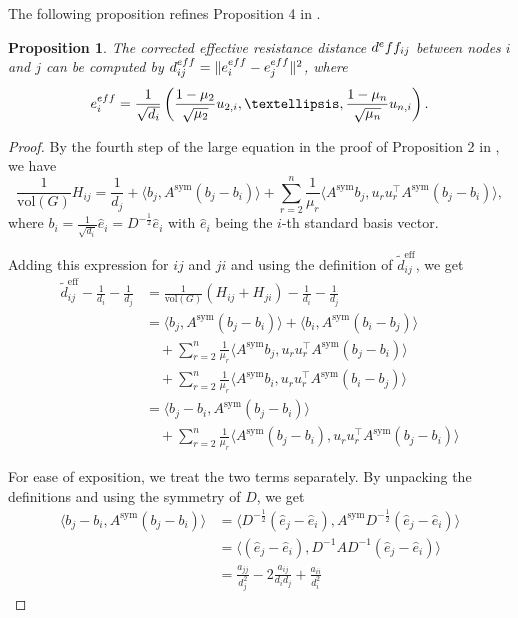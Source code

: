 \documentclass{article}
\newcommand{\asym}{A^{\text{sym}}}
\theoremstyle{plain}
\newtheorem{proposition}[theorem]{Proposition}
\theoremstyle{definition}
\theoremstyle{remark}
\begin{document}
The following proposition refines Proposition 4 in \cite{luxburg2010getting}.
\begin{proposition}\label{prop:corr_eff_res}
The corrected effective resistance distance $d^\textnormal{eff}_{ij}$ between nodes $i$ and $j$ can be computed by \mbox{$d^{\textnormal{eff}}_{ij} = \| e^{\textnormal{eff}}_i -e^{\textnormal{eff}}_j\|^2$,} where 
$$e^{\textnormal{eff}}_i = \frac{1}{\sqrt{d_i}} \left(\frac{1-\mu_2}{\sqrt{\mu_2} }u_{2,i},\dots, \frac{1-\mu_n}{\sqrt{\mu_n} }u_{n,i}\right).$$
\end{proposition}
\begin{proof}
    By the fourth step of the large equation in the proof of Proposition 2 in \cite{von2010hitting}, we have
    \begin{equation}
        \frac{1}{\text{vol}(G) }H_{ij} = \frac{1}{d_j}+ \langle b_j, \asym (b_j-b_i)\rangle + \sum_{r=2}^n \frac{1}{\mu_r} \langle \asym b_j, u_r u_r^\top \asym (b_j -b_i)\rangle,
    \end{equation}
    where $b_i = \frac{1}{\sqrt{d_i}}\hat{e}_i = D^{-\frac{1}{2}}\hat{e}_i$ with $\hat{e}_i$ being the $i$-th standard basis vector.
    
    Adding this expression for $ij$ and $ji$ and using the definition of $\tilde{d}^\text{eff}_{ij}$, we get 
    \begin{align}
        \tilde{d}^\text{eff}_{ij} - \frac{1}{d_i} - \frac{1}{d_j}
        &= \frac{1}{\text{vol}(G)} (H_{ij} + H_{ji})- \frac{1}{d_i} - \frac{1}{d_j} \\
        &= \langle b_j, \asym (b_j -b_i)\rangle +  \langle b_i, \asym (b_i -b_j)\rangle \\
        & \quad +         \sum_{r=2}^n \frac{1}{\mu_r} \langle \asym b_j, u_ru_r^\top \asym (b_j -b_i)\rangle\\
        & \quad+ \sum_{r=2}^n \frac{1}{\mu_r} \langle \asym b_i, u_r u_r^\top \asym (b_i -b_j)\rangle \\
        &= \langle b_j-b_i, \asym (b_j -b_i)\rangle \\
        &\quad + \sum_{r=2}^n \frac{1}{\mu_r} \langle \asym (b_j - b_i), u_r u_r^\top \asym (b_j -b_i)\rangle
    \end{align}
    
    For ease of exposition, we treat the two terms separately. By unpacking the definitions and using the symmetry of $D$, we get
    \begin{align}
        \langle b_j-b_i, \asym (b_j -b_i)\rangle
        &= \langle D^{-\frac{1}{2}}(\hat{e}_j-\hat{e}_i), \asym D^{-\frac{1}{2}}(\hat{e}_j-\hat{e}_i)\rangle\\
        &= \langle (\hat{e}_j-\hat{e}_i), D^{-1} A D^{-1}(\hat{e}_j-\hat{e}_i)\rangle \\
        &= \frac{a_{jj}}{d_j^2} - 2 \frac{a_{ij}}{d_id_j} + \frac{a_{ii}}{d_i^2}
    \end{align}


\end{proof}
\end{document}
